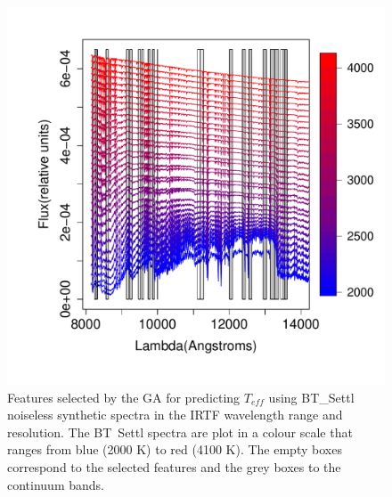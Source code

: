 \begin {figure}
 \centering
  \includegraphics[scale=0.55]{figs/BT-spectraAtIRTF-Inf-teff}
  \caption{Features selected by the GA for predicting $T_{eff}$ using
    BT\_Settl noiseless synthetic spectra in the IRTF wavelength range
    and resolution. The BT\ Settl spectra are plot in a colour scale
    that ranges from blue (2000 K) to red (4100 K). The empty boxes
    correspond to the selected features and the grey boxes to the
    continuum bands.}
\label{fig:irtf-teff}
\end {figure}


